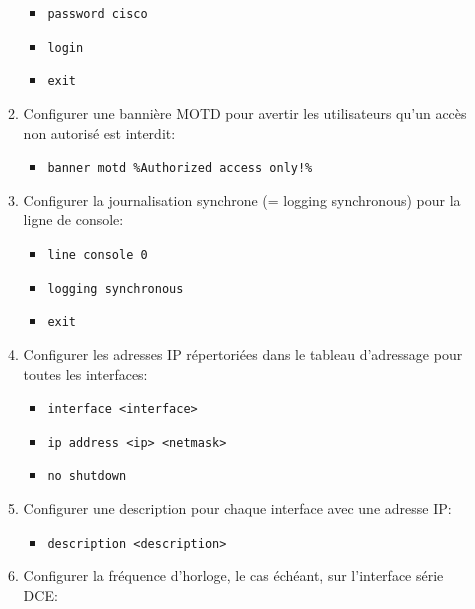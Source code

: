 \documentclass[a4paper]{article}
\begin{document}
\begin{itemize}
\begin{enumerate}
\begin{example}
\begin{itemize}
            \item \texttt{password cisco}
            \item \texttt{login}
            \item \texttt{exit}
        \end{itemize}
    \end{example}
    \item Configurer une bannière MOTD pour avertir les utilisateurs qu'un accès non autorisé est interdit:
    \begin{example}
        \begin{itemize}
            \item \texttt{banner motd \%Authorized access only!\%}
        \end{itemize}
    \end{example}
    \item Configurer la journalisation synchrone (= logging synchronous) pour la ligne de console:
    \begin{example}
        \begin{itemize}
            \item \texttt{line console 0}
            \item \texttt{logging synchronous}
            \item \texttt{exit}
        \end{itemize}
    \end{example}
    \item Configurer les adresses IP répertoriées dans le tableau d'adressage pour toutes les interfaces:
    \begin{example}
        \begin{itemize}
            \item \texttt{interface <interface>}
            \item \texttt{ip address <ip> <netmask>}
            \item \texttt{no shutdown}
        \end{itemize}
    \end{example}
    \item Configurer une description pour chaque interface avec une adresse IP:
    \begin{example}
        \begin{itemize}
            \item \texttt{description <description>}
        \end{itemize}
    \end{example}
    \item Configurer la fréquence d'horloge, le cas échéant, sur l'interface série DCE:

\end{enumerate}
\end{itemize}
\end{document}
